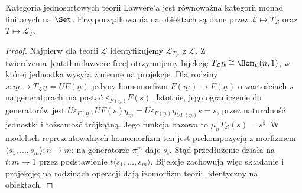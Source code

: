 \begin{twierdzenie}\label{cat:thm:lawvere-equivalence}
Kategoria jednosortowych teorii Lawvere'a jest równoważna kategorii monad finitarych na $\Set$. Przyporządkowania na obiektach są dane przez $\mathcal L\mapsto T_{\mathcal L}$ oraz $T\mapsto\mathcal L_T$.
\end{twierdzenie}
\begin{proof}
Najpierw dla teorii $\mathcal L$ identyfikujemy $\mathcal L_{T_{\mathcal L}}$ z $\mathcal L$. Z twierdzenia~\ref{cat:thm:lawvere-free} otrzymujemy bijekcję $T_{\mathcal L}\underline n\cong\Hom_{\mathcal L}(n,1)$, w której jednostka wysyła zmienne na projekcje. Dla rodziny $s:\underline m\to T_{\mathcal L}\underline n=UF(\underline n)$ jedyny homomorfizm $F(\underline m)\to F(\underline n)$ o wartościach $s$ na generatorach ma postać $\varepsilon_{F(\underline n)}F(s)$. Istotnie, jego ograniczenie do generatorów jest $U\varepsilon_{F(\underline n)}UF(s)\eta_{\underline m}=U\varepsilon_{F(\underline n)}\eta_{UF(\underline n)}s=s$, przez naturalność jednostki i tożsamość trójkątną. Jego funkcja bazowa to $\mu_{\underline n}T_{\mathcal L}(s)=s^\sharp$. W modelach reprezentowalnych homomorfizm ten jest prekompozycją z morfizmem $\langle s_1,\ldots,s_m\rangle:n\to m$: na generatorze $\pi_i^m$ daje $s_i$. Stąd przedłużenie działa na $t:m\to1$ przez podstawienie $t\langle s_1,\ldots,s_m\rangle$. Bijekcje zachowują więc składanie i projekcje; na rodzinach operacji dają izomorfizm teorii, identyczny na obiektach.


\end{proof}
